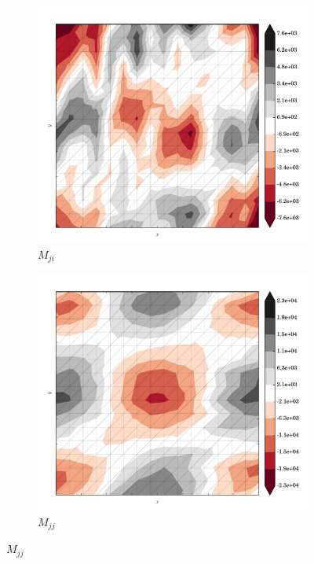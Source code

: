 \begin{figure}
  \begin{subfigure}[b]{0.3\linewidth}
    \includegraphics[width=\linewidth]{images/stress_balance/RS/M_ji.pdf}
  \caption{$M_{ji}$}
  \label{rs_M_ji}
  \end{subfigure}
  \begin{subfigure}[b]{0.3\linewidth}
    \includegraphics[width=\linewidth]{images/stress_balance/RS/M_jj.pdf}
  \caption{$M_{jj}$}
  \label{rs_M_jj}
  \end{subfigure}

\end{figure}
